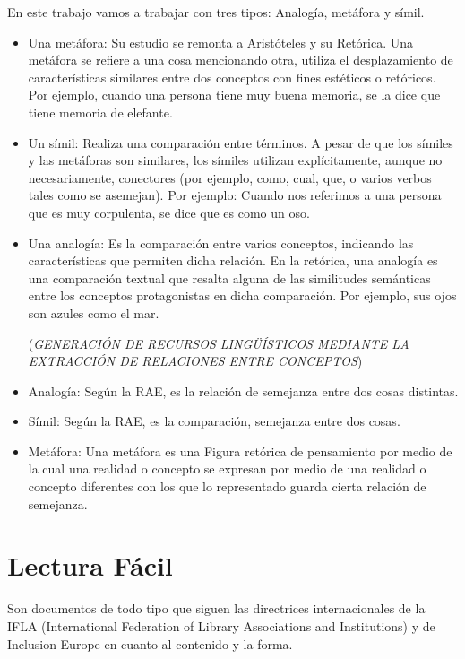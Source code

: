 En este trabajo vamos a trabajar con tres tipos: Analogía, metáfora y símil.
\begin{itemize}
	\item Una metáfora: Su estudio se remonta a Aristóteles y su Retórica. Una metáfora se refiere a una cosa mencionando otra, utiliza el desplazamiento de características similares entre dos conceptos con fines estéticos o retóricos. Por ejemplo, cuando una persona tiene muy buena memoria, se la dice que tiene memoria de elefante.
	
	\item Un símil: Realiza una comparación entre términos. A pesar de que los símiles y las metáforas son similares, los símiles utilizan explícitamente, aunque no necesariamente, conectores (por ejemplo, como, cual, que, o varios verbos tales como se asemejan).
	Por ejemplo: Cuando nos referimos a una persona que es muy corpulenta, se dice que es como un oso.
	
	\item Una analogía: Es la comparación entre varios conceptos, indicando las características que permiten dicha relación. En la retórica, una analogía es una comparación textual que resalta alguna de las similitudes semánticas entre los conceptos protagonistas en dicha comparación. Por ejemplo, sus ojos son azules como el mar.
	
(\textit {GENERACIÓN DE RECURSOS LINGÜÍSTICOS MEDIANTE LA EXTRACCIÓN DE RELACIONES ENTRE CONCEPTOS})	
	
\end{itemize}

\begin{itemize}
\item Analogía: Según la RAE, es la relación de semejanza entre dos cosas distintas.
\item Símil: Según la RAE, es la comparación, semejanza entre dos cosas.
\item Metáfora: Una metáfora es una Figura retórica de pensamiento por medio de la cual una realidad o concepto se expresan por medio de una realidad o concepto diferentes con los que lo representado guarda cierta relación de semejanza.
\end{itemize}



\section{Lectura Fácil}

Son documentos de todo tipo que siguen las directrices internacionales de la IFLA (International Federation of Library Associations and Institutions) y de Inclusion Europe en cuanto al contenido y la forma.

